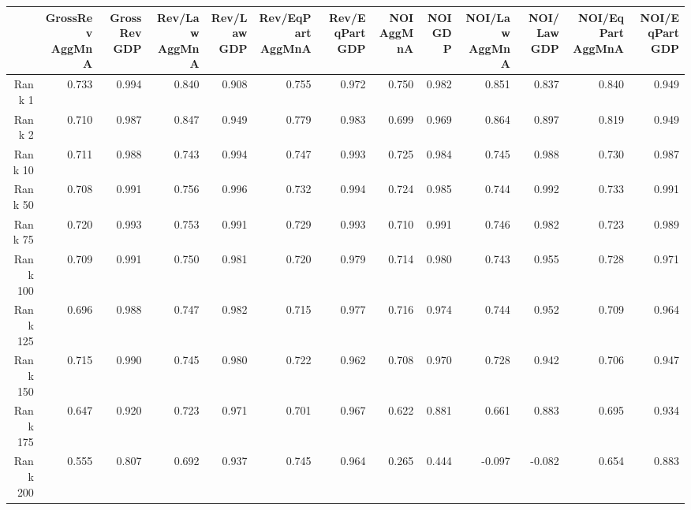 \begin{table}[ht]
\centering
\begin{tabular}{rrrrrrrrrrrrr}
  \hline
 & GrossRev AggMnA & GrossRev GDP & Rev/Law AggMnA & Rev/Law GDP & Rev/EqPart AggMnA & Rev/EqPart GDP & NOI AggMnA & NOI GDP & NOI/Law AggMnA & NOI/Law GDP & NOI/EqPart AggMnA & NOI/EqPart GDP \\ 
  \hline
Rank 1 & 0.733 & 0.994 & 0.840 & 0.908 & 0.755 & 0.972 & 0.750 & 0.982 & 0.851 & 0.837 & 0.840 & 0.949 \\ 
  Rank 2 & 0.710 & 0.987 & 0.847 & 0.949 & 0.779 & 0.983 & 0.699 & 0.969 & 0.864 & 0.897 & 0.819 & 0.949 \\ 
  Rank 10 & 0.711 & 0.988 & 0.743 & 0.994 & 0.747 & 0.993 & 0.725 & 0.984 & 0.745 & 0.988 & 0.730 & 0.987 \\ 
  Rank 50 & 0.708 & 0.991 & 0.756 & 0.996 & 0.732 & 0.994 & 0.724 & 0.985 & 0.744 & 0.992 & 0.733 & 0.991 \\ 
  Rank 75 & 0.720 & 0.993 & 0.753 & 0.991 & 0.729 & 0.993 & 0.710 & 0.991 & 0.746 & 0.982 & 0.723 & 0.989 \\ 
  Rank 100 & 0.709 & 0.991 & 0.750 & 0.981 & 0.720 & 0.979 & 0.714 & 0.980 & 0.743 & 0.955 & 0.728 & 0.971 \\ 
  Rank 125 & 0.696 & 0.988 & 0.747 & 0.982 & 0.715 & 0.977 & 0.716 & 0.974 & 0.744 & 0.952 & 0.709 & 0.964 \\ 
  Rank 150 & 0.715 & 0.990 & 0.745 & 0.980 & 0.722 & 0.962 & 0.708 & 0.970 & 0.728 & 0.942 & 0.706 & 0.947 \\ 
  Rank 175 & 0.647 & 0.920 & 0.723 & 0.971 & 0.701 & 0.967 & 0.622 & 0.881 & 0.661 & 0.883 & 0.695 & 0.934 \\ 
  Rank 200 & 0.555 & 0.807 & 0.692 & 0.937 & 0.745 & 0.964 & 0.265 & 0.444 & -0.097 & -0.082 & 0.654 & 0.883 \\ 
   \hline
\end{tabular}
\end{table}
